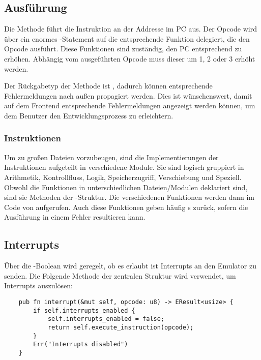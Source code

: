 \subsection{Ausführung}

Die  Methode führt die Instruktion an der Addresse im PC aus. Der Opcode wird über ein enormes -Statement auf die entsprechende Funktion delegiert, die den Opcode ausführt. Diese Funktionen sind zuständig, den \ac{PC} entsprechend zu erhöhen. Abhängig vom ausgeführten Opcode muss dieser um 1, 2 oder 3 erhöht werden.

Der Rückgabetyp der Methode ist , dadurch können entsprechende Fehlermeldungen nach außen propagiert werden. Dies ist wünschenswert, damit auf dem Frontend entsprechende Fehlermeldungen angezeigt werden können, um dem Benutzer den Entwicklungsprozess zu erleichtern.

\subsubsection{Instruktionen}

Um zu großen Dateien vorzubeugen, sind die Implementierungen der Instruktionen aufgeteilt in verschiedene Module. Sie sind logisch gruppiert in Arithmetik, Kontrollfluss, Logik, Speicherzugriff, Verschiebung und Speziell.
Obwohl die Funktionen in unterschiedlichen Dateien/Modulen deklariert sind, sind sie Methoden der -Struktur.
Die verschiedenen Funktionen werden dann im Code von  aufgerufen.
Auch diese Funktionen geben häufig s zurück, sofern die Ausführung in einem Fehler resultieren kann.

\subsection{Interrupts}

Über die -Boolean wird geregelt, ob es erlaubt ist Interrupts an den Emulator zu senden. Die Folgende Methode der zentralen Struktur wird verwendet, um Interrupts auszulösen:

\begin{verbatim}
    pub fn interrupt(&mut self, opcode: u8) -> EResult<usize> {
        if self.interrupts_enabled {
            self.interrupts_enabled = false;
            return self.execute_instruction(opcode);
        }
        Err("Interrupts disabled")
    }
\end{verbatim}

